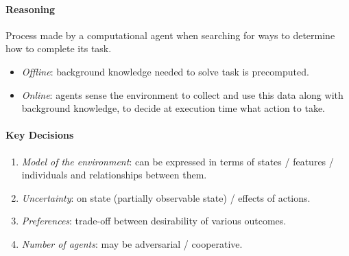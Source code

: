 \documentclass[twocolumn,english]{article}
\begin{document}
\paragraph{Reasoning}

Process made by a computational agent when searching for ways to determine
how to complete its task.
\begin{itemize}
\item \emph{Offline}: background knowledge needed to solve task is precomputed.
\item \emph{Online}: agents sense the environment to collect and use this
data along with background knowledge, to decide at execution time
what action to take.
\end{itemize}

\paragraph{Key Decisions}
\begin{enumerate}
\item \emph{Model of the environment}: can be expressed in terms of states
/ features / individuals and relationships between them.
\item \emph{Uncertainty}: on state (partially observable state) / effects
of actions.
\item \emph{Preferences}: trade-off between desirability of various outcomes.
\item \emph{Number of agents}: may be adversarial / cooperative.
\end{enumerate}
\end{document}
